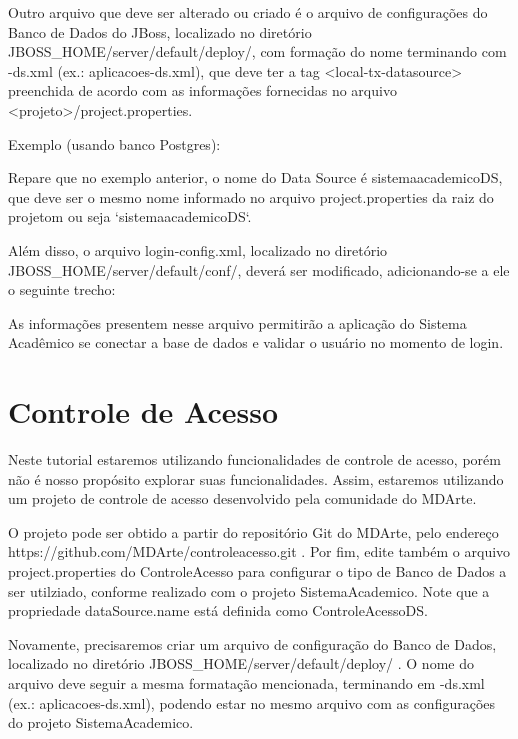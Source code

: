 Outro arquivo que deve ser alterado ou criado é o arquivo de configurações do Banco de Dados do JBoss, localizado no diretório JBOSS\_HOME/server/default/deploy/, com formação do nome terminando com -ds.xml (ex.: aplicacoes-ds.xml), que deve ter a tag <local-tx-datasource> preenchida de acordo com as informações fornecidas no arquivo <projeto>/project.properties.

Exemplo (usando banco Postgres):

\begin{framed}
	
\end{framed}

Repare que no exemplo anterior, o nome do Data Source é sistemaacademicoDS, que deve ser o mesmo nome informado no arquivo project.properties da raiz do projetom ou seja `sistemaacademicoDS`.

Além disso, o arquivo login-config.xml, localizado no diretório JBOSS\_HOME/server/default/conf/, deverá ser modificado, adicionando-se a ele o seguinte trecho:

\begin{framed}
	
\end{framed}

As informações presentem nesse arquivo permitirão a aplicação do Sistema Acadêmico se conectar a base de dados e validar o usuário no momento de login.

\section{Controle de Acesso}

Neste tutorial estaremos utilizando funcionalidades de controle de acesso, porém não é nosso propósito explorar suas funcionalidades. Assim, estaremos utilizando um projeto de controle de acesso desenvolvido pela comunidade do MDArte.

O projeto pode ser obtido a partir do repositório Git do MDArte, pelo endereço https://github.com/MDArte/controleacesso.git . Por fim, edite também o arquivo project.properties do ControleAcesso para configurar o tipo de Banco de Dados a ser utilziado, conforme realizado com o projeto SistemaAcademico. Note que a propriedade dataSource.name está definida como ControleAcessoDS.

Novamente, precisaremos criar um arquivo de configuração do Banco de Dados, localizado no diretório JBOSS\_HOME/server/default/deploy/ . O nome do arquivo deve seguir a mesma formatação mencionada, terminando em -ds.xml (ex.: aplicacoes-ds.xml), podendo estar no mesmo arquivo com as configurações do projeto SistemaAcademico.

